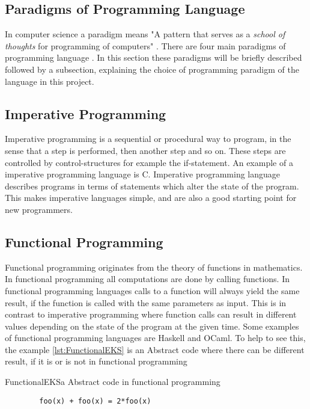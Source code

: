 \subsection{Paradigms of Programming Language}
In computer science 
a paradigm means "A pattern that serves as a \textit{school of thoughts} for programming of computers" \citep{ProgrammingParadigms2}. 
There are four main paradigms of programming language \citep{ProgrammingParadigms}. In this section these paradigms will be briefly described followed by a subsection, explaining the choice of programming paradigm of the language in this project.

\subsection{Imperative Programming}
Imperative programming is a sequential or procedural way to program, in the sense that a step is performed, then another step and so on. These steps are controlled by control-structures for example the if-statement. An example of a imperative programming language is C. Imperative programming language describes programs in terms of statements which alter the state of the program. This makes imperative languages simple, and are also a good starting point for new programmers.


\subsection{Functional Programming}
Functional programming originates from the theory of functions in mathematics. In functional programming all computations are done by calling functions. In functional programming languages calls to a function will always yield the same result, if the function is called with the same parameters as input. This is in contrast to imperative programming where function calls can result in different values depending on the state of the program at the given time. Some examples of functional programming languages are Haskell and OCaml. 
To help to see this, the example \ref{lst:FunctionalEKS} is an Abstract code where there can be different result, if it is or is not in functional programming

\begin{code}{FunctionalEKS}{a Abstract code in functional programming}
	\begin{lstlisting}
		foo(x) + foo(x) = 2*foo(x)
	\end{lstlisting}
\end{code}

